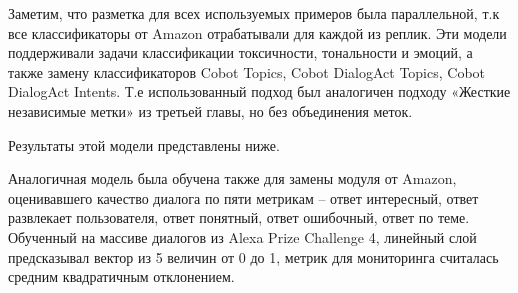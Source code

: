 Заметим, что разметка для всех используемых примеров была параллельной, т.к все классификаторы от Amazon отрабатывали для каждой из реплик. Эти модели поддерживали задачи классификации токсичности, тональности и эмоций, а также замену классификаторов Cobot Topics, Cobot DialogAct Topics, Cobot DialogAct Intents. Т.е использованный подход был аналогичен подходу «Жесткие независимые метки» из третьей главы, но без объединения меток. 

Результаты этой модели представлены ниже.

\begin{table}[htbp]
    \caption{Точность (взвешенный-F1) для многозадачной классификации для различных моделей. «1 в 1» означает оригинальные модели, «6 в 1» -- многозадачную модель с одним линейным слоем, обученную на аннотациях всех упомянутых в таблице классификаторов, «3 в 1 (cobot)» -- многозадачную модель с одним линейным слоем, обученную только на аннотациях классификаторов cobot topics, cobot dialogact topics и cobot dialogact intents, «3 в 1 (не cobot)» -- многозадачную модель с одним линейным слоем, обученную только на аннотациях остальных классификаторов(классификаторы эмоций, тональности и токсичности).}
    \label{mtldream:1}
    \centering
\end{table}

Аналогичная модель была обучена также для замены модуля от Amazon, оценивавшего качество диалога по пяти метрикам -- ответ интересный, ответ развлекает пользователя, ответ понятный, ответ ошибочный, ответ по теме. Обученный на массиве диалогов из Alexa Prize Challenge 4, линейный слой предсказывал вектор из 5 величин от 0 до 1, метрик для мониторинга считалась средним квадратичным отклонением.

